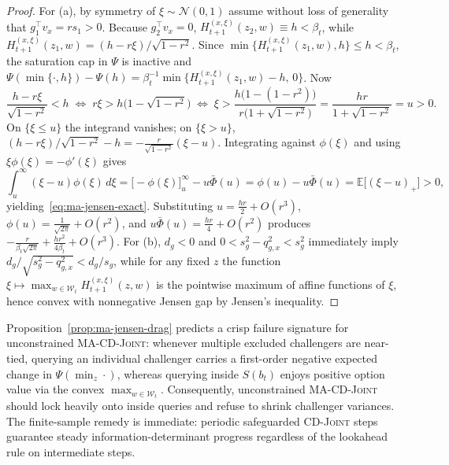 \documentclass{article}
\theoremstyle{plain}
\theoremstyle{definition}
\begin{document}
\begin{proof}
For (a), by symmetry of $\xi \sim \mathcal{N}(0,1)$ assume without loss of generality that $g_1^\top v_x = r s_1 > 0$. Because $g_2^\top v_x = 0$, $H_{t+1}^{(x,\xi)}(z_2, w) \equiv h < \beta_t$, while $H_{t+1}^{(x,\xi)}(z_1, w) = (h - r\xi)/\sqrt{1 - r^2}$. Since $\min\{H_{t+1}^{(x,\xi)}(z_1, w), h\} \le h < \beta_t$, the saturation cap in $\Psi$ is inactive and $\Psi(\min\{\cdot, h\}) - \Psi(h) = \beta_t^{-1}\min\{H_{t+1}^{(x,\xi)}(z_1, w) - h,\, 0\}$. Now
\[
  \frac{h - r\xi}{\sqrt{1 - r^2}} < h
  \;\Longleftrightarrow\;
  r\xi > h\bigl(1 - \sqrt{1 - r^2}\bigr)
  \;\Longleftrightarrow\;
  \xi > \frac{h\bigl(1 - (1 - r^2)\bigr)}{r\bigl(1 + \sqrt{1 - r^2}\bigr)} = \frac{h r}{1 + \sqrt{1 - r^2}} = u > 0.
\]
On $\{\xi \le u\}$ the integrand vanishes; on $\{\xi > u\}$, $(h - r\xi)/\sqrt{1 - r^2} - h = -\frac{r}{\sqrt{1 - r^2}}(\xi - u)$. Integrating against $\phi(\xi)$ and using $\xi\phi(\xi) = -\phi'(\xi)$ gives
\[
  \int_u^\infty (\xi - u)\phi(\xi)\,d\xi
  = \bigl[-\phi(\xi)\bigr]_u^\infty - u\bar\Phi(u)
  = \phi(u) - u\bar\Phi(u)
  = \mathbb{E}\bigl[(\xi - u)_+\bigr] > 0,
\]
yielding~\eqref{eq:ma-jensen-exact}. Substituting $u = \frac{hr}{2} + O(r^3)$, $\phi(u) = \frac{1}{\sqrt{2\pi}} + O(r^2)$, and $u\bar\Phi(u) = \frac{hr}{4} + O(r^2)$ produces $-\frac{r}{\beta_t\sqrt{2\pi}} + \frac{hr^2}{4\beta_t} + O(r^3)$. For (b), $d_g < 0$ and $0 < s_g^2 - q_{g,x}^2 < s_g^2$ immediately imply $d_g / \sqrt{s_g^2 - q_{g,x}^2} < d_g / s_g$, while for any fixed $z$ the function $\xi \mapsto \max_{w \in \mathcal{W}_t} H_{t+1}^{(x,\xi)}(z, w)$ is the pointwise maximum of affine functions of $\xi$, hence convex with nonnegative Jensen gap by Jensen's inequality.
\end{proof}

Proposition~\ref{prop:ma-jensen-drag} predicts a crisp failure signature for unconstrained \textsc{MA-CD-Joint}: whenever multiple excluded challengers are near-tied, querying an individual challenger carries a first-order negative expected change in $\Psi(\min_z \cdot)$, whereas querying inside $S(b_t)$ enjoys positive option value via the convex $\max_{w \in \mathcal{W}_t}$. Consequently, unconstrained \textsc{MA-CD-Joint} should lock heavily onto inside queries and refuse to shrink challenger variances. The finite-sample remedy is immediate: periodic safeguarded \textsc{CD-Joint} steps guarantee steady information-determinant progress regardless of the lookahead rule on intermediate steps.
\end{document}
